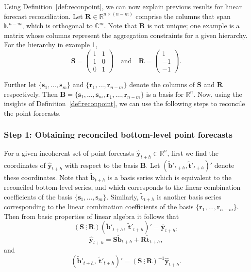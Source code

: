 \documentclass[a4paper, 11pt]{article}
\begin{document}
Using Definition~\ref{def:reconpoint}, we can now explain previous results for linear forecast reconciliation. Let $\bm{R} \in \mathbb{R}^{n \times (n-m)}$ comprise the columns that span $\bm{\mathbb{N}}^{n-m}$, which is orthogonal to $\mathbb{C}^m$. Note that $\bm{R}$ is not unique; one example is a matrix whose columns represent the aggregation constraints for a given hierarchy. For the hierarchy in example 1, 
$$ 
\bm{S} = 
\begin{pmatrix} 
1& 1 \\ 1 & 0 \\ 0&1 
\end{pmatrix} 
\quad \text{and} \quad 
\bm{R} = 
\begin{pmatrix}  
1 \\ -1 \\ -1 
\end{pmatrix}.
$$ 

Further let $\{\bm{s}_1,\dots,\bm{s}_m\}$ and $\{\bm{r}_1,\dots,\bm{r}_{n-m}\}$ denote the columns of $\bm{S}$ and $\bm{R}$ respectively. Then $\bm{B}=\{\bm{s}_1,\dots,\bm{s}_m, \bm{r}_1,\dots,\bm{r}_{n-m}\}$ is a basis for $\mathbb{R}^n$. Now, using the insights of Definition~\ref{def:reconpoint}, we can use the following steps to reconcile the point forecasts.

\subsubsection*{Step 1: Obtaining reconciled bottom-level point forecasts}

For a given incoherent set of point forecasts $\hat{\bm{y}}_{t+h} \in \mathbb{R}^n$, first we find the coordinates of $\hat{\bm{y}}_{t+h}$ with respect to the basis $\bm{B}$. Let $(\tilde{\bm{b}}'_{t+h} , \tilde{\bm{t}}'_{t+h})'$ denote these coordinates. Note that $\tilde{\bm{b}}_{t+h}$ is a basis series which is equivalent to the reconciled bottom-level series, and which corresponds to the linear combination coefficients of the basis $\{\bm{s}_1,\dots,\bm{s}_m\}$. Similarly, $\tilde{\bm{t}}_{t+h}$ is another basis series corresponding to the linear combination coefficients of the basis $\{\bm{r}_1,\dots,\bm{r}_{n-m}\}$. Then from basic properties of linear algebra it follows that 
\[
(\bm{S} ~ \vdots~ \bm{R})
(\tilde{\bm{b}}'_{t+h},~ \tilde{\bm{t}}'_{t+h})'
= \hat{\bm{y}}_{t+h},
\]
\[
\hat{\bm{y}}_{t+h} = \bm{S}\tilde{\bm{b}}_{t+h} +  \bm{R}\tilde{\bm{t}}_{t+h},
\]
and
\begin{equation}\label{4.3}
(\tilde{\bm{b}}'_{t+h}, ~ \tilde{\bm{t}}'_{t+h})' =
(\bm{S} ~ \vdots~ \bm{R})^{-1}
\hat{\bm{y}}_{t+h}.
\end{equation}
\end{document}

